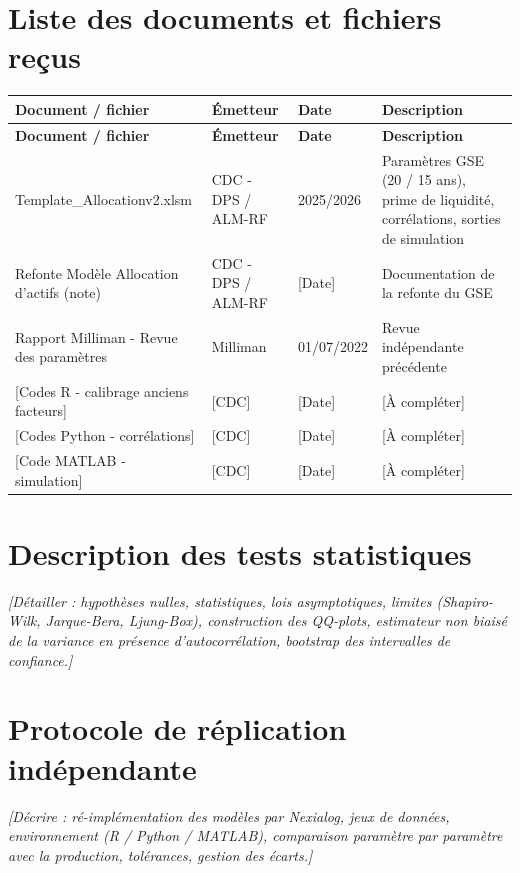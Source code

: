 \documentclass[11pt,a4paper]{article}
\newcommand{\tablehead}[1]{\textcolor{nxnavy}{\sffamily\bfseries\small #1}}
\newcommand{\tabcaption}[1]{\par\vspace{2pt}{\centering\footnotesize\textcolor{nxgray}{\itshape #1}\par}\vspace{8pt}}
\newcommand{\ph}[1]{\textcolor{nxgray}{\itshape #1}}
\begin{document}
\section{Liste des documents et fichiers reçus}

\begin{longtable}{P{4.6cm}P{2.8cm}P{1.6cm}P{4.6cm}}
\toprule
\tablehead{Document / fichier} & \tablehead{Émetteur} & \tablehead{Date} & \tablehead{Description} \\
\midrule\endfirsthead
\toprule
\tablehead{Document / fichier} & \tablehead{Émetteur} & \tablehead{Date} & \tablehead{Description} \\
\midrule\endhead
\bottomrule\endfoot
{\small Template\_Allocationv2.xlsm} & {\small CDC - DPS / ALM-RF} & {\small 2025/2026} & {\small Paramètres GSE (20 / 15 ans), prime de liquidité, corrélations, sorties de simulation} \\
{\small Refonte Modèle Allocation d'actifs (note)} & {\small CDC - DPS / ALM-RF} & {\small [Date]} & {\small Documentation de la refonte du GSE} \\
{\small Rapport Milliman - Revue des paramètres} & {\small Milliman} & {\small 01/07/2022} & {\small Revue indépendante précédente} \\
{\small [Codes R - calibrage anciens facteurs]} & {\small [CDC]} & {\small [Date]} & {\small [À compléter]} \\
{\small [Codes Python - corrélations]} & {\small [CDC]} & {\small [Date]} & {\small [À compléter]} \\
{\small [Code MATLAB - simulation]} & {\small [CDC]} & {\small [Date]} & {\small [À compléter]} \\
\end{longtable}
\vspace{-10pt}
\tabcaption{Inventaire des éléments transmis}

\section{Description des tests statistiques}
\ph{[Détailler : hypothèses nulles, statistiques, lois asymptotiques, limites (Shapiro-Wilk, Jarque-Bera, Ljung-Box), construction des QQ-plots, estimateur non biaisé de la variance en présence d'autocorrélation, bootstrap des intervalles de confiance.]}

\section{Protocole de réplication indépendante}
\ph{[Décrire : ré-implémentation des modèles par Nexialog, jeux de données, environnement (R / Python / MATLAB), comparaison paramètre par paramètre avec la production, tolérances, gestion des écarts.]}
\end{document}

